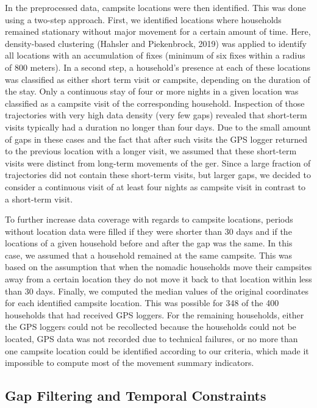\documentclass[]{elsarticle} %
\begin{document}
In the preprocessed data, campsite locations were then identified. This
was done using a two-step approach. First, we identified locations where
households remained stationary without major movement for a certain
amount of time. Here, density-based clustering (Hahsler and Piekenbrock,
2019) was applied to identify all locations with an accumulation of
fixes (minimum of six fixes within a radius of 800 meters). In a second
step, a household's presence at each of these locations was classified
as either short term visit or campsite, depending on the duration of the
stay. Only a continuous stay of four or more nights in a given location
was classified as a campsite visit of the corresponding household.
Inspection of those trajectories with very high data density (very few
gaps) revealed that short-term visits typically had a duration no longer
than four days. Due to the small amount of gaps in these cases and the
fact that after such visits the GPS logger returned to the previous
location with a longer visit, we assumed that these short-term visits
were distinct from long-term movements of the ger. Since a large
fraction of trajectories did not contain these short-term visits, but
larger gaps, we decided to consider a continuous visit of at least four
nights as campsite visit in contrast to a short-term visit.

To further increase data coverage with regards to campsite locations,
periods without location data were filled if they were shorter than 30
days and if the locations of a given household before and after the gap
was the same. In this case, we assumed that a household remained at the
same campsite. This was based on the assumption that when the nomadic
households move their campsites away from a certain location they do not
move it back to that location within less than 30 days. Finally, we
computed the median values of the original coordinates for each
identified campsite location. This was possible for 348 of the 400
households that had received GPS loggers. For the remaining households,
either the GPS loggers could not be recollected because the households
could not be located, GPS data was not recorded due to technical
failures, or no more than one campsite location could be identified
according to our criteria, which made it impossible to compute most of
the movement summary indicators.

\hypertarget{gap-filtering-and-temporal-constraints}{%
\subsection{Gap Filtering and Temporal
Constraints}\label{gap-filtering-and-temporal-constraints}}
\end{document}
